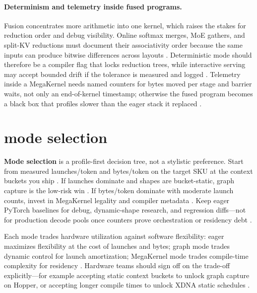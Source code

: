 \paragraph{Determinism and telemetry inside fused programs.}
Fusion concentrates more arithmetic into one kernel, which raises the stakes for reduction order and debug visibility. Online softmax merges, MoE gathers, and split-KV reductions must document their associativity order because the same inputs can produce bitwise differences across layouts \citep{dao2022flashattention,dao2023flashdecoding,patel2025llminference}. Deterministic mode should therefore be a compiler flag that locks reduction trees, while interactive serving may accept bounded drift if the tolerance is measured and logged \citep{chen2020compilerbasedhardw,yirage2026}. Telemetry inside a MegaKernel needs named counters for bytes moved per stage and barrier waits, not only an end-of-kernel timestamp; otherwise the fused program becomes a black box that profiles slower than the eager stack it replaced \citep{memoryfloor2026,taxbreak2026,nvidia2022hopper}.

\section{mode selection}
\label{sec:ch12_mode_selection}

\textbf{Mode selection} is a profile-first decision tree, not a stylistic preference. Start from measured launches/token and bytes/token on the target SKU at the context buckets you ship \citep{taxbreak2026,memoryfloor2026,patel2025llminference}. If launches dominate and shapes are bucket-static, graph capture is the low-risk win \citep{nvidia2024cudagraphs,memoryfloor2026}. If bytes/token dominate with moderate launch counts, invest in MegaKernel legality and compiler metadata \citep{yirage2026,dao2022flashattention,chen2020compilerbasedhardw}. Keep eager PyTorch baselines for debug, dynamic-shape research, and regression diffs---not for production decode pools once counters prove orchestration or residency debt \citep{kwon2023vllm,taxbreak2026}.

Each mode trades hardware utilization against software flexibility: eager maximizes flexibility at the cost of launches and bytes; graph mode trades dynamic control for launch amortization; MegaKernel mode trades compile-time complexity for residency \citep{memoryfloor2026,yirage2026,chen2020compilerbasedhardw,amd2024xdna}. Hardware teams should sign off on the trade-off explicitly---for example accepting static context buckets to unlock graph capture on Hopper, or accepting longer compile times to unlock XDNA static schedules \citep{nvidia2024cudagraphs,amd2024aie,patel2025llminference,semianalysis2024tma}.

